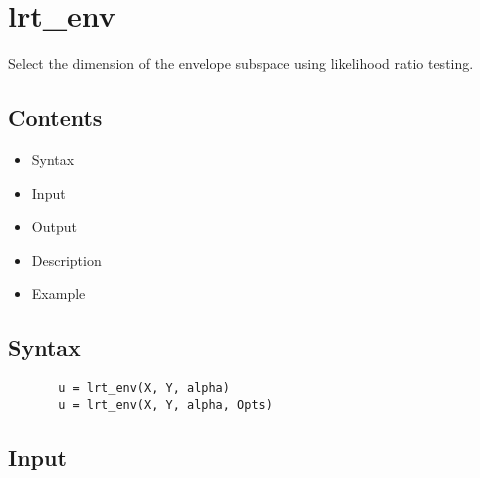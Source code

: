 \documentclass[a4paper,11pt,openany]{memoir}
\begin{document}
\newpage

\rmfamily
\color{black}\section{lrt\_env}

\begin{par}
Select the dimension of the envelope subspace using likelihood ratio testing.
\end{par} \vspace{1em}

\subsection*{Contents}

\begin{itemize}
\setlength{\itemsep}{-1ex}
   \item Syntax
   \item Input
   \item Output
   \item Description
   \item Example
\end{itemize}


\subsection*{Syntax}


\begin{verbatim}       u = lrt_env(X, Y, alpha)
       u = lrt_env(X, Y, alpha, Opts)\end{verbatim}
    

\subsection*{Input}
\end{document}
